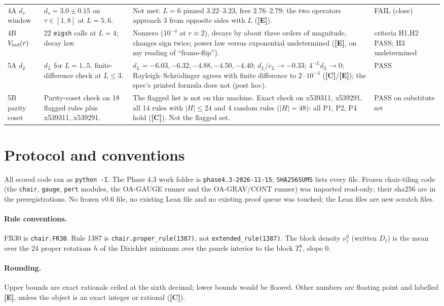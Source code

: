 \documentclass[10pt]{article}
\newcommand{\lab}[1]{\textbf{[#1]}}
\begin{document}
\begin{longtable}{p{1.7cm}p{3.6cm}p{8.0cm}p{2.5cm}}
4A $d_s$ window & $d_s=3.0\pm0.15$ on $\tau\in[1,8]$ at $L=5,6$. & Not met: $L=6$ pinned $3.22$--$3.23$, free $2.76$--$2.79$; the two operators approach $3$ from opposite sides with $L$ (\lab{E}). & FAIL (close)\\
4B $V_{\rm ind}(r)$ & 22 \texttt{eigsh} calls at $L=4$; decay law. & Nonzero ($10^{-4}$ at $r\approx2$), decays by about three orders of magnitude, changes sign twice; power law versus exponential undetermined (\lab{E}, on my reading of ``frame-flip''). & criteria H1,H2 PASS; H3 undetermined\\
5A $d_L$ & $d_L$ for $L=1..5$, finite-difference check at $L\le3$. & $d_L=-6.03,-6.32,-4.88,-4.50,-4.40$; $d_L/c_L\to-0.33$; $4^{-L}d_L\to0$; Rayleigh--Schr\"odinger agrees with finite difference to $2\cdot10^{-4}$ (\lab{C}/\lab{E}); the spec's printed formula does not (post hoc). & PASS\\
5B parity coset & Parity-coset check on 18 flagged rules plus x539311, x539291. & The flagged list is not on this machine. Exact check on x539311, x539291, all 14 rules with $|H|\le24$ and 4 random rules ($|H|=48$): all P1, P2, P4 hold (\lab{C}). Not the flagged set. & PASS on substitute set\\
\bottomrule
\end{longtable}

\section{Protocol and conventions}
All scored code ran as \texttt{python -I}. The Phase 4.3 work folder is \texttt{phase4.3-2026-11-15}; \texttt{SHA256SUMS} lists every file. Frozen chair-tiling code (the \texttt{chair}, \texttt{gauge}, \texttt{pert} modules, the OA-GAUGE runner and the OA-GRAV/CONT runner) was imported read-only; their sha256 are in the preregistrations. No frozen v0.6 file, no existing Lean file and no existing proof queue was touched; the Lean files are new scratch files.

\paragraph{Rule conventions.} FR30 is \texttt{chair.FR30}. Rule 1387 is \texttt{chair.proper\_rule(1387)}, not \texttt{extended\_rule(1387)}. The block density $\nu^0_\ell$ (written $D_\ell$) is the mean over the 24 proper rotations $h$ of the Dirichlet minimum over the panels interior to the block $T_\ell^h$, slope $0$.

\paragraph{Rounding.} Upper bounds are exact rationals ceiled at the sixth decimal; lower bounds would be floored. Other numbers are floating point and labelled \lab{E}, unless the object is an exact integer or rational (\lab{C}).
\end{document}
